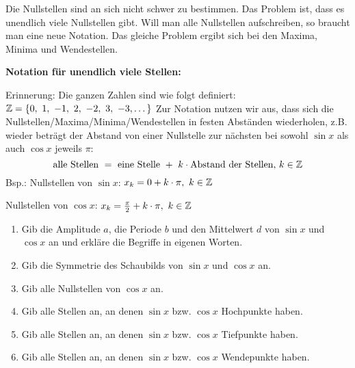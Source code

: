Die Nullstellen sind an sich nicht schwer zu bestimmen. Das Problem ist, dass es unendlich viele Nullstellen gibt. Will man alle Nullstellen aufschreiben, so braucht man eine neue Notation. Das gleiche Problem ergibt sich bei den Maxima, Minima und Wendestellen.
\begin{tcolorbox}
	\textbf{Notation für unendlich viele Stellen:}

	Erinnerung: Die ganzen Zahlen sind wie folgt definiert: \(\mathbb{Z}=\{0,\ 1,\ -1,\ 2,\ -2,\ 3,\ -3,\dots\}\)
	\textcolor{loestc}{Zur Notation nutzen wir aus, dass sich die Nullstellen/Maxima/Minima/Wendestellen in festen Abständen wiederholen, z.B. wieder beträgt der Abstand von einer Nullstelle zur nächsten bei sowohl \(\sin x\) als auch \(\cos x\)	jeweils \(\pi\):
		\[\text{alle Stellen }=\text{ eine Stelle }+\ k\cdot\text{Abstand der Stellen, }k\in\Z\]
		Bsp.: Nullstellen von \(\sin x\): \(x_k=0+k\cdot \pi,\ k\in\mathbb{Z}\)}

        \phantom{Bsp.: }\textcolor{loestc}{Nullstellen von \(\cos x\): \(x_k=\tfrac{\pi}{2}+k\cdot \pi,\ k\in\Z\)}
\end{tcolorbox}

\begin{Exercise}[title={\raggedright\normalfont}, label=eigenschaftenSinCosA1]
	\begin{enumerate}[label=\alph*)]
		\item Gib die Amplitude \(a\), die Periode \(b\) und den Mittelwert \(d\) von \(\sin x\) und \(\cos x\) an und erkläre die Begriffe in eigenen Worten.
		\item Gib die Symmetrie des Schaubilds von \(\sin x\) und \(\cos x\) an.
		\item Gib alle Nullstellen von \(\cos x\) an.
		\item Gib alle Stellen an, an denen \(\sin x\) bzw. \(\cos x\) Hochpunkte haben.
		\item Gib alle Stellen an, an denen \(\sin x\) bzw. \(\cos x\) Tiefpunkte haben.
		\item Gib alle Stellen an, an denen \(\sin x\) bzw. \(\cos x\) Wendepunkte haben.
	\end{enumerate}
\end{Exercise}



